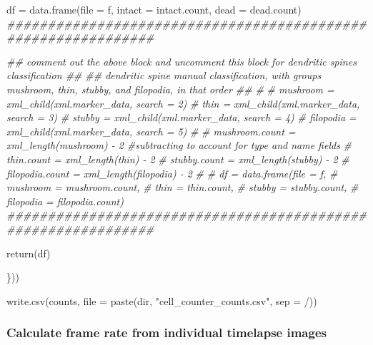 \documentclass[
  12pt,
  a4paper,
]{book}
\newenvironment{Shaded}{}{}
\newcommand{\AttributeTok}[1]{\textcolor[rgb]{0.49,0.56,0.16}{#1}}
\newcommand{\CommentTok}[1]{\textcolor[rgb]{0.38,0.63,0.69}{\textit{#1}}}
\newcommand{\DocumentationTok}[1]{\textcolor[rgb]{0.73,0.13,0.13}{\textit{#1}}}
\newcommand{\FunctionTok}[1]{\textcolor[rgb]{0.02,0.16,0.49}{#1}}
\newcommand{\NormalTok}[1]{#1}
\newcommand{\OtherTok}[1]{\textcolor[rgb]{0.00,0.44,0.13}{#1}}
\newcommand{\StringTok}[1]{\textcolor[rgb]{0.25,0.44,0.63}{#1}}
\begin{document}
\begin{Shaded}
\begin{Highlighting}[]
\NormalTok{  df }\OtherTok{=} \FunctionTok{data.frame}\NormalTok{(}\AttributeTok{file =}\NormalTok{ f,}
                  \AttributeTok{intact =}\NormalTok{ intact.count,}
                  \AttributeTok{dead =}\NormalTok{ dead.count)}
  \DocumentationTok{\#\#\#\#\#\#\#\#\#\#\#\#\#\#\#\#\#\#\#\#\#\#\#\#\#\#\#\#\#\#\#\#\#\#\#\#\#\#\#\#\#\#\#\#\#\#\#\#\#\#\#\#\#\#\#\#\#\#\#\#\#\#}

  \DocumentationTok{\#\# comment out the above block and uncomment this block for dendritic spines classification \#\#}
  \DocumentationTok{\#\# dendritic spine manual classification, with groups \textquotesingle{}mushroom\textquotesingle{}, \textquotesingle{}thin\textquotesingle{}, \textquotesingle{}stubby\textquotesingle{}, and \textquotesingle{}filopodia\textquotesingle{}, in that order \#\#}
  \CommentTok{\#}
  \CommentTok{\# mushroom = xml\_child(xml.marker\_data, search = 2)}
  \CommentTok{\# thin = xml\_child(xml.marker\_data, search = 3)}
  \CommentTok{\# stubby = xml\_child(xml.marker\_data, search = 4)}
  \CommentTok{\# filopodia = xml\_child(xml.marker\_data, search = 5)}
  \CommentTok{\# }
  \CommentTok{\# mushroom.count = xml\_length(mushroom) {-} 2 \#subtracting to account for type and name fields}
  \CommentTok{\# thin.count = xml\_length(thin) {-} 2}
  \CommentTok{\# stubby.count = xml\_length(stubby) {-} 2}
  \CommentTok{\# filopodia.count = xml\_length(filopodia) {-} 2}
  \CommentTok{\# }
  \CommentTok{\# df = data.frame(file = f, }
  \CommentTok{\#                 mushroom = mushroom.count,}
  \CommentTok{\#                 thin = thin.count,}
  \CommentTok{\#                 stubby = stubby.count,}
  \CommentTok{\#                 filopodia = filopodia.count)}
  \DocumentationTok{\#\#\#\#\#\#\#\#\#\#\#\#\#\#\#\#\#\#\#\#\#\#\#\#\#\#\#\#\#\#\#\#\#\#\#\#\#\#\#\#\#\#\#\#\#\#\#\#\#\#\#\#\#\#\#\#\#\#\#\#\#\#}
  
  \FunctionTok{return}\NormalTok{(df)}
  
\NormalTok{\}))}

\FunctionTok{write.csv}\NormalTok{(counts, }\AttributeTok{file =} \FunctionTok{paste}\NormalTok{(dir, }\StringTok{"cell\_counter\_counts.csv"}\NormalTok{, }\AttributeTok{sep =} \StringTok{\textquotesingle{}/\textquotesingle{}}\NormalTok{))}
\end{Highlighting}
\end{Shaded}

\subsubsection{Calculate frame rate from individual timelapse images}\label{timestamp-corr}
\end{document}
